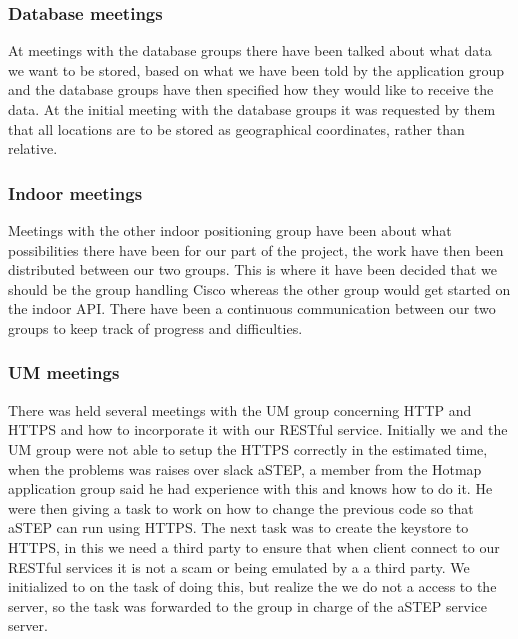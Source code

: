 \subsubsection*{Database meetings}
At meetings with the database groups there have been talked about what data we want to be stored, based on what we have been told by the application group and the database groups have then specified how they would like to receive the data. At the initial meeting with the database groups it was requested by them that all locations are to be stored as geographical coordinates, rather than relative.%

\subsubsection*{Indoor meetings}
Meetings with the other indoor positioning group have been about what possibilities there have been for our part of the project, the work have then been distributed between our two groups. This is where it have been decided that we should be the group handling Cisco whereas the other group would get started on the indoor API. There have been a continuous communication between our two groups to keep track of progress and difficulties. 

\subsubsection*{UM meetings}
There was held several meetings with the UM group concerning HTTP and HTTPS and how to incorporate it with our RESTful service. Initially we and the UM group were not able to setup the HTTPS correctly in the estimated time, when the problems was raises over slack aSTEP, a member from the Hotmap application group said he had experience with this and knows how to do it. He were then giving a task to work on how to change the previous code so that aSTEP can run using HTTPS. The next task was to create the keystore to HTTPS, in this we need a third party to ensure that when client connect to our RESTful services it is not a scam or being emulated by a a third party. We initialized to on the task of doing this, but realize the we do not a access to the server, so the task was forwarded to the group in charge of the aSTEP service server. 

